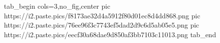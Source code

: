  
 
 
 
 


\ifcmt
  tab_begin cols=3,no_fig,center
     pic https://i2.paste.pics/f8173ae32d4a5912f80d01ec8d4dd868.png
		 pic https://i2.paste.pics/76ee96f3c7743ef5dad2d9c6d5ab05e5.png
		 pic https://i2.paste.pics/eecf30a68dae9d850af3bb7103c11013.png
  tab_end
\fi
